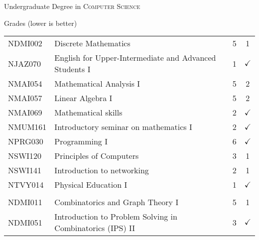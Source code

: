 \documentclass[a4paper,10pt]{article}
\newcommand{\comment}[2]{#2}
\begin{document}

\newpage
\par{\centering\Large \hypertarget{bscMFF}{Undergraduate \comment{Bachelor of Science}  Degree in \textsc{Computer Science}}\par}\large{\centering Grades (lower is better)\par}\normalsize

\begin{center}

\tabletail{%
}
\tablelasttail{}	

\begin{supertabular}{l l c c}
\\
 
 
NDMI002 & Discrete Mathematics & 5 & 1\\
NJAZ070 & English for Upper-Intermediate and Advanced Students I & 1 & $\checkmark$\\
NMAI054 & Mathematical Analysis I & 5 & 2\\
NMAI057 & Linear Algebra I & 5 & 2\\
NMAI069 & Mathematical skills & 2 & $\checkmark$\\
NMUM161 & Introductory seminar on mathematics I & 2 & $\checkmark$\\
NPRG030 & Programming I & 6 & $\checkmark$\\
NSWI120 & Principles of Computers & 3 & 1\\
NSWI141 & Introduction to networking & 2 & 1\\
NTVY014 & Physical Education I & 1 & $\checkmark$\\

\hline\\

NDMI011 & Combinatorics and Graph Theory I & 5 & 1\\

NDMI051 & Introduction to Problem Solving in Combinatorics (IPS) II & 3 & $\checkmark$\\


\end{supertabular}
\end{center}
\end{document}
